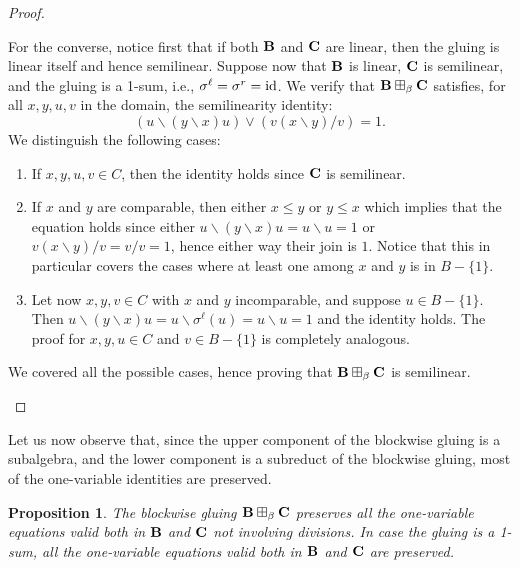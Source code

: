 \documentclass{amsart}
\newtheorem{proposition}[theorem]{Proposition}
\theoremstyle{definition}
\numberwithin{equation}{section}
\newcommand{\alg}[1]{{\textbf{\upshape #1}}}  %
\newcommand{\sell}{\sigma^\ell}
\newcommand{\sr}{\sigma^r}
\begin{document}
\begin{proof}
\begin{enumerate}
		For the converse, notice first that if both $\alg B$ and $\alg C$ are linear, then the gluing is linear itself and hence semilinear. Suppose now that $\alg B$ is linear, $\alg C$ is semilinear, and the gluing is a 1-sum, i.e., $\sell = \sr = {\rm id}$.
		We verify that $\alg B \boxplus_\beta \alg C$ satisfies, for all $x,y,u,v$ in the domain, the semilinearity identity: 
		\begin{equation*}
	        (u\backslash(y \backslash x)u) \lor  (v(x \backslash y )/ v)=1.
       \end{equation*}
       We distinguish the following cases: 
       \begin{enumerate}
       	\item If $x, y, u,v \in C$, then the identity holds since $\alg C$ is semilinear.
       	\item If $x$ and $y$ are comparable, then either $x \leq y$ or $y \leq x$  which implies that the equation holds since either $u\backslash(y \backslash x)u = u \backslash u = 1$ or $v(x \backslash y )/ v = v / v = 1$, hence either way their join is $1$. Notice that this in particular covers the cases where at least one among $x$ and $y$ is in $B-\{1\}$.
       	\item Let now $x, y, v \in C$ with $x$ and $y$ incomparable, and suppose $u \in B-\{1\}$. Then $u\backslash(y \backslash x)u = u \backslash \sell(u) = u \backslash u = 1$ and the identity holds. The proof for $x, y, u \in C$ and $v \in B-\{1\}$ is completely analogous.
       \end{enumerate}
        We covered all the possible cases, hence proving that $\alg B \boxplus_\beta \alg C$ is semilinear.\qedhere
\end{enumerate}
\end{proof}
Let us now observe that, since the upper component of the blockwise gluing is a subalgebra, and the lower component is a subreduct of the blockwise gluing, most of the one-variable identities are preserved. 

\begin{proposition}
	The blockwise gluing $\alg B \boxplus_\beta \alg C$ preserves all the one-variable equations valid both in $\alg B$ and $\alg C$ not involving divisions. In case the gluing is a 1-sum, all the one-variable equations valid both in $\alg B$ and $\alg C$ are preserved. 
\end{proposition}
\end{document}
